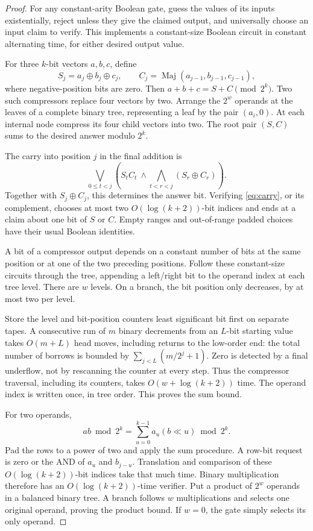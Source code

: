 \documentclass[11pt]{article}
\theoremstyle{definition}
\theoremstyle{remark}
\DeclareMathOperator{\Maj}{Maj}
\begin{document}
\begin{proof}
For any constant-arity Boolean gate, guess the values of its inputs existentially, reject unless they give the claimed output, and universally choose an input claim to verify. This implements a constant-size Boolean circuit in constant alternating time, for either desired output value.

For three $k$-bit vectors $a,b,c$, define
\[
 S_j=a_j\oplus b_j\oplus c_j,\qquad
 C_j=\Maj(a_{j-1},b_{j-1},c_{j-1}),
\]
where negative-position bits are zero. Then $a+b+c=S+C\pmod{2^k}$. Two such compressors replace four vectors by two. Arrange the $2^w$ operands at the leaves of a complete binary tree, representing a leaf by the pair $(a_i,0)$. At each internal node compress its four child vectors into two. The root pair $(S,C)$ sums to the desired answer modulo $2^k$.

The carry into position $j$ in the final addition is
\begin{equation}\label{eq:carry}
 \bigvee_{0\le t<j}\left(S_tC_t\ \wedge\!
       \bigwedge_{t<r<j}(S_r\oplus C_r)\right).
\end{equation}
Together with $S_j\oplus C_j$, this determines the answer bit. Verifying \eqref{eq:carry}, or its complement, chooses at most two $O(\log(k+2))$-bit indices and ends at a claim about one bit of $S$ or $C$. Empty ranges and out-of-range padded choices have their usual Boolean identities.

A bit of a compressor output depends on a constant number of bits at the same position or at one of the two preceding positions. Follow these constant-size circuits through the tree, appending a left/right bit to the operand index at each tree level. There are $w$ levels. On a branch, the bit position only decreases, by at most two per level.

Store the level and bit-position counters least significant bit first on separate tapes. A consecutive run of $m$ binary decrements from an $L$-bit starting value takes $O(m+L)$ head moves, including returns to the low-order end: the total number of borrows is bounded by $\sum_{j<L}(m/2^j+1)$. Zero is detected by a final underflow, not by rescanning the counter at every step. Thus the compressor traversal, including its counters, takes $O(w+\log(k+2))$ time. The operand index is written once, in tree order. This proves the sum bound.

For two operands,
\[
 ab\bmod2^k=\sum_{u=0}^{k-1}a_u(b\ll u)\bmod2^k.
\]
Pad the rows to a power of two and apply the sum procedure. A row-bit request is zero or the AND of $a_u$ and $b_{j-u}$. Translation and comparison of these $O(\log(k+2))$-bit indices take that much time. Binary multiplication therefore has an $O(\log(k+2))$-time verifier. Put a product of $2^w$ operands in a balanced binary tree. A branch follows $w$ multiplications and selects one original operand, proving the product bound. If $w=0$, the gate simply selects its only operand.
\end{proof}
\end{document}
